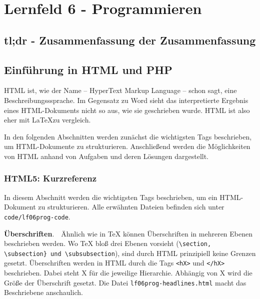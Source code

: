 \section{Lernfeld 6 - Programmieren}

\subsection{tl;dr - Zusammenfassung der Zusammenfassung}

\subsection{Einführung in HTML und PHP}

HTML ist, wie der Name -- HyperText Markup Language -- schon sagt, eine Beschreibungsssprache. Im Gegensatz zu Word sieht das interpretierte Ergebnis eines HTML-Dokuments nicht so aus, wie sie geschrieben wurde. HTML ist also eher mit \LaTeX zu vergleich.

In den folgenden Abschnitten werden zunächst die wichtigsten Tags beschrieben, um HTML-Dokumente zu strukturieren. Anschließend werden die Möglichkeiten von HTML anhand von Aufgaben und deren Lösungen dargestellt.

\subsubsection{HTML5: Kurzreferenz}
In diesem Abschnitt werden die wichtigsten Tags beschrieben, um ein HTML-Dokument zu strukturieren. Alle erwähnten Dateien befinden sich unter \texttt{code/lf06prog-code}.\newline

{\bf Überschriften}.\ \ Ähnlich wie in TeX können Überschriften in mehreren Ebenen beschrieben werden. Wo TeX bloß drei Ebenen vorsieht (\verb+\section, \subsection} und \subsubsection+), sind durch HTML prinzipiell keine Grenzen gesetzt. Überschriften werden in HTML durch die Tags \texttt{<hX>} und \texttt{</hX>} beschrieben. Dabei steht X für die jeweilige Hierarchie. Abhängig von X wird die Größe der Überschrift gesetzt. Die Datei \texttt{lf06prog-headlines.html} macht das Beschriebene anschaulich.\newline

